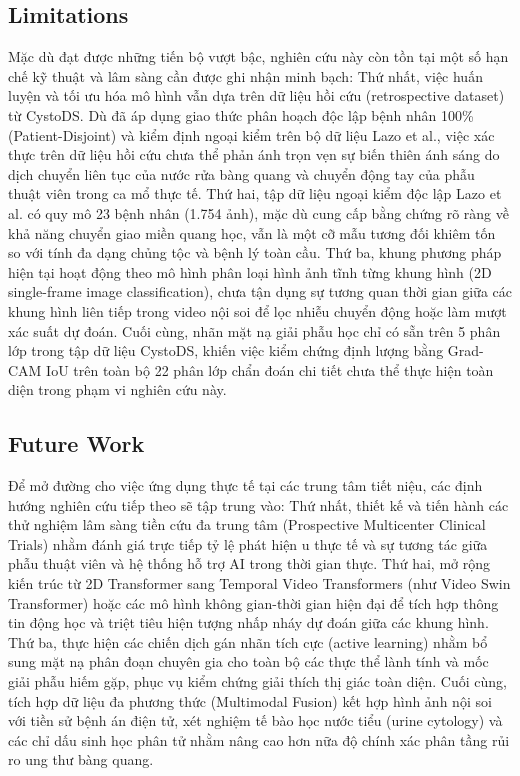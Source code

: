 \documentclass[runningheads]{llncs}
\begin{document}
\subsection{Limitations}
Mặc dù đạt được những tiến bộ vượt bậc, nghiên cứu này còn tồn tại một số hạn chế kỹ thuật và lâm sàng cần được ghi nhận minh bạch:
Thứ nhất, việc huấn luyện và tối ưu hóa mô hình vẫn dựa trên dữ liệu hồi cứu (retrospective dataset) từ CystoDS. Dù đã áp dụng giao thức phân hoạch độc lập bệnh nhân 100\% (Patient-Disjoint) và kiểm định ngoại kiểm trên bộ dữ liệu Lazo et al., việc xác thực trên dữ liệu hồi cứu chưa thể phản ánh trọn vẹn sự biến thiên ánh sáng do dịch chuyển liên tục của nước rửa bàng quang và chuyển động tay của phẫu thuật viên trong ca mổ thực tế.
Thứ hai, tập dữ liệu ngoại kiểm độc lập Lazo et al. có quy mô 23 bệnh nhân (1.754 ảnh), mặc dù cung cấp bằng chứng rõ ràng về khả năng chuyển giao miền quang học, vẫn là một cỡ mẫu tương đối khiêm tốn so với tính đa dạng chủng tộc và bệnh lý toàn cầu.
Thứ ba, khung phương pháp hiện tại hoạt động theo mô hình phân loại hình ảnh tĩnh từng khung hình (2D single-frame image classification), chưa tận dụng sự tương quan thời gian giữa các khung hình liên tiếp trong video nội soi để lọc nhiễu chuyển động hoặc làm mượt xác suất dự đoán.
Cuối cùng, nhãn mặt nạ giải phẫu học chỉ có sẵn trên 5 phân lớp trong tập dữ liệu CystoDS, khiến việc kiểm chứng định lượng bằng Grad-CAM IoU trên toàn bộ 22 phân lớp chẩn đoán chi tiết chưa thể thực hiện toàn diện trong phạm vi nghiên cứu này.

\subsection{Future Work}
Để mở đường cho việc ứng dụng thực tế tại các trung tâm tiết niệu, các định hướng nghiên cứu tiếp theo sẽ tập trung vào:
Thứ nhất, thiết kế và tiến hành các thử nghiệm lâm sàng tiền cứu đa trung tâm (Prospective Multicenter Clinical Trials) nhằm đánh giá trực tiếp tỷ lệ phát hiện u thực tế và sự tương tác giữa phẫu thuật viên và hệ thống hỗ trợ AI trong thời gian thực.
Thứ hai, mở rộng kiến trúc từ 2D Transformer sang Temporal Video Transformers (như Video Swin Transformer) hoặc các mô hình không gian-thời gian hiện đại để tích hợp thông tin động học và triệt tiêu hiện tượng nhấp nháy dự đoán giữa các khung hình.
Thứ ba, thực hiện các chiến dịch gán nhãn tích cực (active learning) nhằm bổ sung mặt nạ phân đoạn chuyên gia cho toàn bộ các thực thể lành tính và mốc giải phẫu hiếm gặp, phục vụ kiểm chứng giải thích thị giác toàn diện.
Cuối cùng, tích hợp dữ liệu đa phương thức (Multimodal Fusion) kết hợp hình ảnh nội soi với tiền sử bệnh án điện tử, xét nghiệm tế bào học nước tiểu (urine cytology) và các chỉ dấu sinh học phân tử nhằm nâng cao hơn nữa độ chính xác phân tầng rủi ro ung thư bàng quang.
\end{document}
